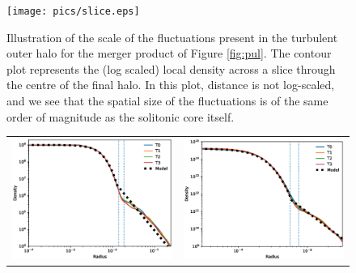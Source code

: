 \documentclass[a4paper,11pt]{article}
\begin{document}
\begin{figure}
\centering
\texttt{[image: pics/slice.eps]}
\caption{Illustration of the scale of the fluctuations present in the turbulent outer halo for the merger product of Figure \ref{fig:pul}. The contour plot represents the (log scaled) local density across a slice through the centre of the final halo. In this plot, distance is not log-scaled, and we see that the spatial size of the fluctuations is of the same order of magnitude as the solitonic core itself.}\label{fig:contour}
\end{figure}

\begin{figure}
\begin{tabular}{cc}
{\includegraphics[scale = 0.5, trim={1cm 0cm 1cm 0.35cm}]{pics/combined_small.eps}} &
{\includegraphics[scale = 0.5, trim={1cm 0cm 1cm 0.35cm}]{pics/combined.eps}}

\end{tabular}
\end{figure}
\end{document}
